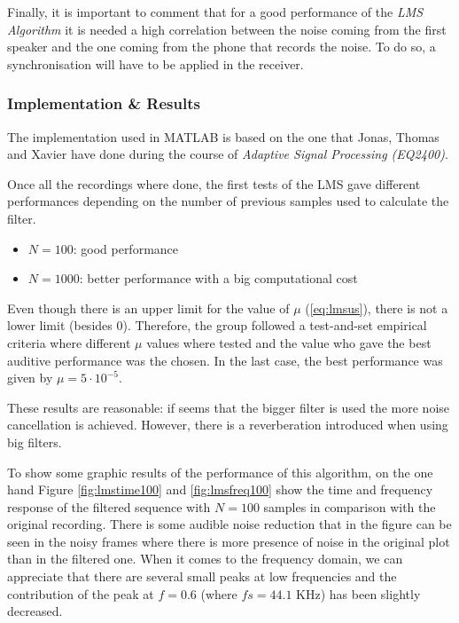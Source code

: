 \documentclass[11pt,a4paper,english]{book}  %
\theoremstyle{definition}  %
\theoremstyle{plain}  %
\theoremstyle{remark}  %
\begin{document}
		Finally, it is important to comment that for a good performance of the \textit{LMS Algorithm} it is needed a high correlation between the noise coming from the first speaker and the one coming from the phone that records the noise. To do so, a synchronisation will have to be applied in the receiver.
		
	
	\subsubsection{Implementation \& Results}
	
	The implementation used in MATLAB is based on the one that Jonas, Thomas and Xavier have done during the course of \textit{Adaptive Signal Processing (EQ2400)}.
	
	Once all the recordings where done, the first tests of the LMS gave different performances depending on the number of previous samples used to calculate the filter.
	
	\begin{itemize}
	\item $N=100$: good performance
	\item $N=1000$: better performance with a big computational cost
	\end{itemize}
	
	Even though there is an upper limit for the value of $\mu$ (\ref{eq:lmsus}), there is not a lower limit (besides $0$). Therefore, the group followed a test-and-set empirical criteria where different $\mu$ values where tested and the value who gave the best auditive performance was the chosen. In the last case, the best performance was given by $\mu=5 \cdot 10^{-5}.$
	
	These results are reasonable: if seems that the bigger filter is used the more noise cancellation is achieved. However, there is a reverberation introduced when using big filters.
	
	To show some graphic results of the performance of this algorithm, on the one hand Figure \ref{fig:lmstime100} and \ref{fig:lmsfreq100} show the time and frequency response of the filtered sequence with $N=100$ samples in comparison with the original recording. There is some audible noise reduction that in the figure can be seen in the noisy frames where there is more presence of noise in the original plot than in the filtered one. When it comes to the frequency domain, we can appreciate that there are several small peaks at low frequencies and the contribution of the peak at $f=0.6$ (where $fs=44.1$ KHz) has been slightly decreased.
	
\end{document}
